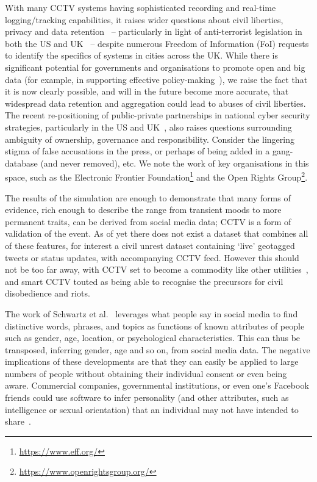 \documentclass[conference]{IEEEtran}
\begin{document}
With many CCTV systems having sophisticated recording and real-time
logging/tracking capabilities, it raises wider questions about civil
liberties, privacy and data retention~\cite{goold:2002} --
particularly in light of anti-terrorist legislation in both the US
and UK~\cite{bowden:2002} -- despite numerous Freedom of Information
(FoI) requests to identify the specifics of systems in cities across
the UK. While there is significant potential for governments and
organisations to promote open and big data (for example, in supporting
effective policy-making~\cite{nesta:2015}), we raise the fact that it
is now clearly possible, and will in the future become more accurate,
that widespread data retention and aggregation could lead to abuses of
civil liberties. The recent re-positioning of public-private
partnerships in national cyber security strategies, particularly in
the US and UK~\cite{carr+crick:2015}, also raises questions
surrounding ambiguity of ownership, governance and
responsibility. Consider the lingering stigma of false accusations in
the press, or perhaps of being added in a gang-database (and never
removed), etc. We note the work of key organisations in this space,
such as the Electronic Frontier
Foundation\footnote{\url{https://www.eff.org/}} and the Open Rights
Group\footnote{\url{https://www.openrightsgroup.org/}}.

The results of the simulation are enough to demonstrate that many
forms of evidence, rich enough to describe the range from transient
moods to more permanent traits, can be derived from social media data;
CCTV is a form of validation of the event. As of yet there does not
exist a dataset that combines all of these features, for interest a
civil unrest dataset containing `live' geotagged tweets or status
updates, with accompanying CCTV feed. However this should not be too
far away, with CCTV set to become a commodity like other
utilities~\cite{graham:2002}, and smart CCTV touted as being able to
recognise the precursors for civil disobedience and riots.

The work of Schwartz et al.~\cite{schwartz-et-al:2013}
leverages what people say in social media to find distinctive words,
phrases, and topics as functions of known attributes of people such as
gender, age, location, or psychological characteristics. This can thus
be transposed, inferring gender, age and so on, from social media
data. The negative implications of these developments are that they
can easily be applied to large numbers of people without obtaining
their individual consent or even being aware. Commercial companies,
governmental institutions, or even one's Facebook friends could use
software to infer personality (and other attributes, such as
intelligence or sexual orientation) that an individual may not have
intended to share~\cite{lambiotte+kosinski:2014}.
\end{document}
